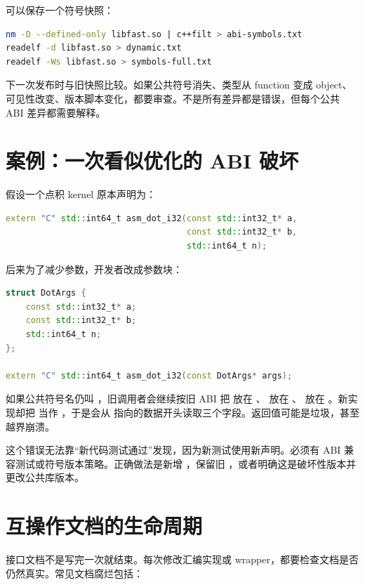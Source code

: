 可以保存一个符号快照：

\begin{lstlisting}[language=bash]
nm -D --defined-only libfast.so | c++filt > abi-symbols.txt
readelf -d libfast.so > dynamic.txt
readelf -Ws libfast.so > symbols-full.txt
\end{lstlisting}

下一次发布时与旧快照比较。如果公共符号消失、类型从 function 变成 object、可见性改变、版本脚本变化，都要审查。不是所有差异都是错误，但每个公共 ABI 差异都需要解释。

\section{案例：一次看似优化的 ABI 破坏}

假设一个点积 kernel 原本声明为：

\begin{lstlisting}[language=C++]
extern "C" std::int64_t asm_dot_i32(const std::int32_t* a,
                                    const std::int32_t* b,
                                    std::int64_t n);
\end{lstlisting}

后来为了减少参数，开发者改成参数块：

\begin{lstlisting}[language=C++]
struct DotArgs {
    const std::int32_t* a;
    const std::int32_t* b;
    std::int64_t n;
};

extern "C" std::int64_t asm_dot_i32(const DotArgs* args);
\end{lstlisting}

如果公共符号名仍叫 ，旧调用者会继续按旧 ABI 把  放在 、 放在 、 放在 。新实现却把  当作 ，于是会从  指向的数据开头读取三个字段。返回值可能是垃圾，甚至越界崩溃。

这个错误无法靠“新代码测试通过”发现，因为新测试使用新声明。必须有 ABI 兼容测试或符号版本策略。正确做法是新增 ，保留旧 ，或者明确这是破坏性版本并更改公共库版本。

\section{互操作文档的生命周期}

接口文档不是写完一次就结束。每次修改汇编实现或 wrapper，都要检查文档是否仍然真实。常见文档腐烂包括：

